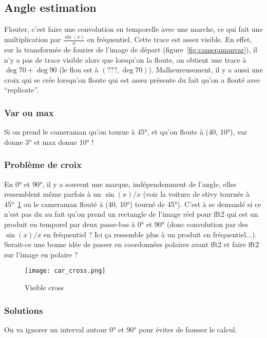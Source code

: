 \documentclass{article}
\begin{document}
\subsection{Angle estimation}
Flouter, c'est faire une convolution en temporelle avec une marche,
ce qui fait une multiplication par $\frac{\sin(x)}{x}$ en fréquentiel.
Cette trace est assez visible.
En effet, sur la transformée de fourier de l'image de départ (figure~\ref{fig:cameramanvar}), il n'y a pas de trace visible alors
que lorsqu'on la floute, on obtient une trace à $\deg{70} + \deg{90}$ (le flou est à $(???, \deg{70})$).
Malheureusement, il y a aussi une croix qui se crée lorsqu'on floute qui est assez présente du fait qu'on a flouté avec ``replicate''.


\subsubsection{Var ou max}
Si on prend le cameraman qu'on tourne à \ang{45}, et qu'on floute à (40, \ang{10}), var donne \ang{3} et max donne \ang{10} !

\subsubsection{Problème de croix}
En \ang{0} et \ang{90}, il y a souvent une marque, indépendemment de l'angle, elles ressemblent même parfois à un $\sin(x)/x$ (voir la voiture de stivy tournée à \ang{45}~\ref{fig:car_cross} ou le cameraman flouté à (40, \ang{10}) tourné de \ang{45}).
C'est à se demandé si ce n'est pas du au fait qu'on prend un rectangle de l'image réel pour fft2
qui est un produit en temporel par deux passe-bas à \ang{0} et \ang{90}
(donc convolution par des $\sin(x)/x$ en fréquentiel ? Ici ça ressemble plus à un produit en fréquentiel...).
Serait-ce une bonne idée de passer en coordonnées polaires avant fft2 et faire fft2 sur l'image en polaire ?

\begin{figure}[!ht]
  \centering
  \texttt{[image: car\_cross.png]}
  \caption{Visible cross}
  \label{fig:car_cross}
\end{figure}

\subsubsection{Solutions}
On va ignorer un interval autour \ang{0} et \ang{90} pour éviter de fausser le calcul.
\end{document}
